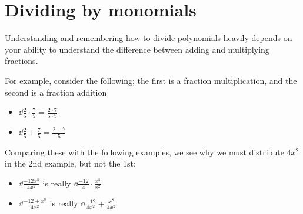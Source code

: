\section{Dividing by monomials}
Understanding and remembering how to divide polynomials heavily depends on your ability to understand
the difference between adding and multiplying fractions.

For example, consider the following; the first is a fraction multiplication, 
and the second is a fraction addition
\begin{multicols}{2}
	\begin{itemize}
		\item $\dd\frac{2}{5}\cdot \frac{7}{5}= \frac{2\cdot 7}{5\cdot 5}$
		\item $\dd\frac{2}{5}+\frac{7}{5} = \frac{2+7}{5}$
	\end{itemize} 
\end{multicols}
Comparing these with the following examples, we see why we must distribute $4x^2$ in the 2nd example, but
not the 1st:
\begin{itemize}
	\item $\dd\frac{-12x^8}{4x^2}$ is really $\dd\frac{-12}{4}\cdot \frac{x^8}{x^2}$
	\item $\dd\frac{-12+x^8}{4x^2}$ is really $\dd\frac{-12}{4x^2}+\frac{x^8}{4x^2}$
\end{itemize} 

